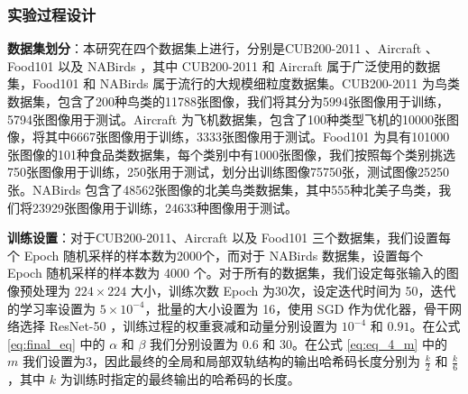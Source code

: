 \subsubsection{实验过程设计}

\textbf{数据集划分}：本研究在四个数据集上进行，分别是CUB200-2011 \cite{Wah2011TheCB}、Aircraft \cite{maji2013finegrained}、Food101 \cite{food101_2014} 以及 NABirds \cite{nabirds2015}，其中 CUB200-2011 和 Aircraft 属于广泛使用的数据集，Food101 和 NABirds 属于流行的大规模细粒度数据集。CUB200-2011 为鸟类数据集，包含了200种鸟类的11788张图像，我们将其分为5994张图像用于训练，5794张图像用于测试。Aircraft 为飞机数据集，包含了100种类型飞机的10000张图像，将其中6667张图像用于训练，3333张图像用于测试。Food101 为具有101000张图像的101种食品类数据集，每个类别中有1000张图像，我们按照每个类别挑选750张图像用于训练，250张用于测试，划分出训练图像75750张，测试图像25250张。NABirds 包含了48562张图像的北美鸟类数据集，其中555种北美子鸟类，我们将23929张图像用于训练，24633种图像用于测试。


\textbf{训练设置}：对于CUB200-2011、Aircraft 以及 Food101 三个数据集，我们设置每个 Epoch 随机采样的样本数为2000个，而对于 NABirds 数据集，设置每个 Epoch 随机采样的样本数为 4000 个。对于所有的数据集，我们设定每张输入的图像预处理为 $224 \times 224$ 大小，训练次数 Epoch 为30次，设定迭代时间为 50，迭代的学习率设置为 $5 \times 10^{-4}$，批量的大小设置为 16，使用 SGD 作为优化器，骨干网络选择 ResNet-50 \cite{he2015deep}，训练过程的权重衰减和动量分别设置为 $10^{-4}$ 和 $0.91$。在公式 \ref{eq:final_eq} 中的 $\alpha$ 和 $\beta$ 我们分别设置为 $0.6$ 和 $30$。在公式 \ref{eq:eq_4_m} 中的 $m$ 我们设置为3，因此最终的全局和局部双轨结构的输出哈希码长度分别为 $\frac{k}{2}$ 和 $\frac{k}{6}$，其中 $k$ 为训练时指定的最终输出的哈希码的长度。



